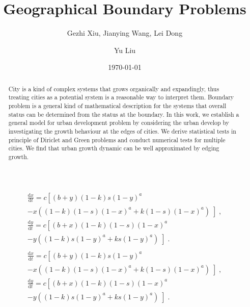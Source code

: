 \documentclass[reprint,unsortedaddress,amsmath,amssymb,floatfix,aps,prl,showkeys]{revtex4-2}
\begin{document}
\title{Geographical Boundary Problems}
\author{Gezhi Xiu, Jianying Wang, Lei Dong}
\author{Yu Liu}
\date{\today}

\begin{abstract}
    City is a kind of complex systems that grows organically and expandingly, thus treating cities as a potential system is a reasonable way to interpret them. Boundary problem is a general kind of mathematical description for the systems that overall status can be determined from the status at the boundary. In this work, we establish a general model for urban development problem by considering the urban develop by investigating the growth behaviour at the edges of cities. We derive statistical tests in principle of Diriclet and Green problems and conduct numerical tests for multiple cities. We find that urban growth dynamic can be well approximated by edging growth.
\end{abstract}

\maketitle

\begin{align*}
\begin{array}{ccc}
    \frac{{\mathrm{d}}x}{{\mathrm{d}}t} = c\left[\right.(b+y)(1-k)s{(1-y)}^{a}\\ -x\left((1-k)(1-s){(1-x)}^{a}+k(1-s){(1-x)}^{a}\right)\left]\right.,\\ \frac{{\mathrm{d}}y}{{\mathrm{d}}t} = c\left[\right.(b+x)(1-k)(1-s){(1-x)}^{a}\\ -y\left((1-k)s{(1-y)}^{a}+ks{(1-y)}^{a}\right)\left]\right..
\end{array}\\
\begin{array}{ccc}\frac{{\mathrm{d}}x}{{\mathrm{d}}t} = c\left[\right.(b+y)(1-k)s{(1-y)}^{a}\\ -x\left((1-k)(1-s){(1-x)}^{a}+k(1-s){(1-x)}^{a}\right)\left]\right.,\\ \frac{{\mathrm{d}}y}{{\mathrm{d}}t} = c\left[\right.(b+x)(1-k)(1-s){(1-x)}^{a}\\ -y\left((1-k)s{(1-y)}^{a}+ks{(1-y)}^{a}\right)\left]\right..\end{array}
\end{align*}


% 
\end{document}
